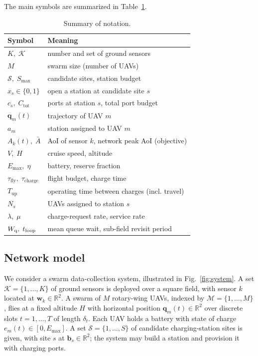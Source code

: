 
The main symbols are summarized in Table~\ref{tab:notation}.

\begin{table}[t]
  \centering
  \caption{Summary of notation.}
  \label{tab:notation}
  \begin{tabular}{ll}
    \toprule
    Symbol & Meaning \\
    \midrule
    $K,\;\mathcal{K}$ & number and set of ground sensors \\
    $M$ & swarm size (number of UAVs) \\
    $\mathcal{S},\;S_{\max}$ & candidate sites, station budget \\
    $x_s\in\{0,1\}$ & open a station at candidate site $s$ \\
    $c_s,\;C_{\mathrm{tot}}$ & ports at station $s$, total port budget \\
    $\mathbf{q}_m(t)$ & trajectory of UAV $m$ \\
    $a_m$ & station assigned to UAV $m$ \\
    $A_k(t),\;\bar A$ & AoI of sensor $k$, network peak AoI (objective) \\
    $V,\;H$ & cruise speed, altitude \\
    $E_{\max},\;\eta$ & battery, reserve fraction \\
    $\tau_{\mathrm{fly}},\;\tau_{\mathrm{charge}}$ & flight budget, charge time \\
    $T_{\mathrm{up}}$ & operating time between charges (incl. travel) \\
    $N_s$ & UAVs assigned to station $s$ \\
    $\lambda,\;\mu$ & charge-request rate, service rate \\
    $W_{\mathrm q},\;t_{\mathrm{loop}}$ & mean queue wait, sub-field revisit period \\
    \bottomrule
  \end{tabular}
\end{table}

\subsection{Network model}
\label{subsec:network}
We consider a swarm data-collection system, illustrated in Fig.~\ref{fig:system}.
A set $\mathcal{K}=\{1,\dots,K\}$ of ground sensors is deployed over a square
field, with sensor $k$ located at $\mathbf{w}_k\in\mathbb{R}^2$. A swarm of
$M$ rotary-wing UAVs, indexed by $\mathcal{M}=\{1,\dots,M\}$, flies at a fixed
altitude $H$ with horizontal position $\mathbf{q}_m(t)\in\mathbb{R}^2$ over
discrete slots $t=1,\dots,T$ of length $\delta_t$. Each UAV holds a battery with
state of charge $e_m(t)\in[0,E_{\max}]$. A set
$\mathcal{S}=\{1,\dots,S\}$ of candidate charging-station sites is given, with
site $s$ at $\mathbf{b}_s\in\mathbb{R}^2$; the system may build a station and
provision it with charging ports.


